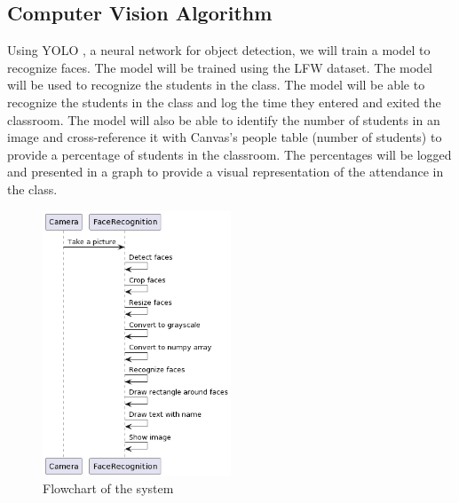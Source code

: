 \subsection{Computer Vision Algorithm}
\label{subsec:Computer Vision Algorithm}
Using YOLO \cite{YOLO}, a neural network for object detection, we will train a model to recognize faces. The model will be trained using the LFW dataset. The model will be used to recognize the students in the class. The model will be able to recognize the students in the class and log the time they entered and exited the classroom. The model will also be able to identify the number of students in an image and cross-reference it with Canvas's people table (number of students) to provide a percentage of students in the classroom. The percentages will be logged and presented in a graph to provide a visual representation of the attendance in the class.\\
\begin{figure}[h]
    \centering
    \includegraphics[width=0.5\textwidth]{images/Diagram-1.png}
    \caption{Flowchart of the system}
    \label{fig:flowchart}
\end{figure}




